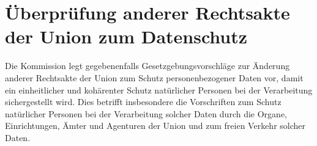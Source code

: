 \chapter{Überprüfung anderer Rechtsakte der Union zum Datenschutz}
\label{ch:98}


Die Kommission legt gegebenenfalls Gesetzgebungsvorschläge zur Änderung anderer Rechtsakte der Union zum Schutz
personenbezogener Daten vor, damit ein einheitlicher und kohärenter Schutz natürlicher Personen bei der Verarbeitung
sichergestellt wird. Dies betrifft insbesondere die Vorschriften zum Schutz natürlicher Personen bei der Verarbeitung
solcher Daten durch die Organe, Einrichtungen, Ämter und Agenturen der Union und zum freien Verkehr solcher Daten.


